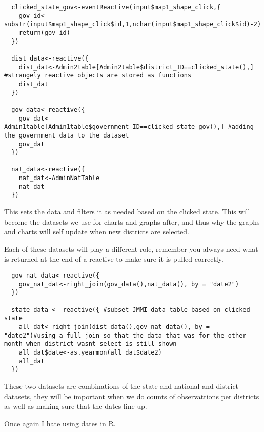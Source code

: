 \documentclass[
]{article}
\begin{document}
\begin{verbatim}
  clicked_state_gov<-eventReactive(input$map1_shape_click,{
    gov_id<- substr(input$map1_shape_click$id,1,nchar(input$map1_shape_click$id)-2)
    return(gov_id)
  })
  
  dist_data<-reactive({
    dist_dat<-Admin2table[Admin2table$district_ID==clicked_state(),] #strangely reactive objects are stored as functions
    dist_dat  
  })
  
  gov_data<-reactive({
    gov_dat<-Admin1table[Admin1table$government_ID==clicked_state_gov(),] #adding the government data to the dataset
    gov_dat
  })
  
  nat_data<-reactive({
    nat_dat<-AdminNatTable
    nat_dat
  })
\end{verbatim}

This sets the data and filters it as needed based on the clicked state.
This will become the datasets we use for charts and graphs after, and
thus why the graphs and charts will self update when new districts are
selected.

Each of these datasets will play a different role, remember you always
need what is returned at the end of a reactive to make sure it is pulled
correctly.

\begin{verbatim}
  gov_nat_data<-reactive({
    gov_nat_dat<-right_join(gov_data(),nat_data(), by = "date2")
  })
  
  state_data <- reactive({ #subset JMMI data table based on clicked state
    all_dat<-right_join(dist_data(),gov_nat_data(), by = "date2")#using a full join so that the data that was for the other month when district wasnt select is still shown
    all_dat$date<-as.yearmon(all_dat$date2)
    all_dat
  })
\end{verbatim}

These two datasets are combinations of the state and national and
district datasets, they will be important when we do counts of
observattions per districts as well as making sure that the dates line
up.

Once again I hate using dates in R.
\end{document}
